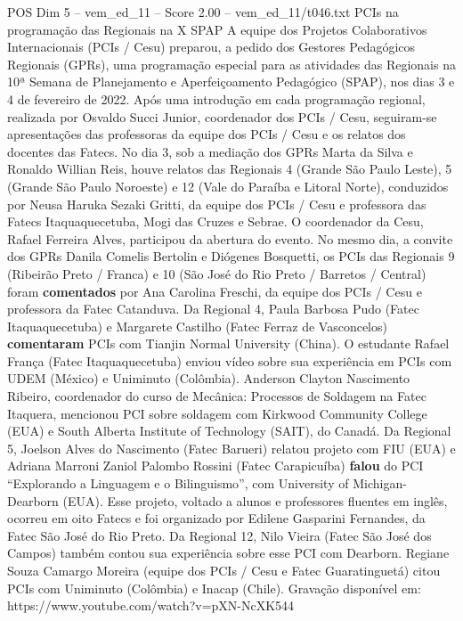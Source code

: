 \begin{textsample}{POS Dim 5 – vem\_ed\_11 – Score 2.00 – vem\_ed\_11/t046.txt}  \label{ex:f5_pos_115}
PCIs na programação das Regionais na X SPAP A equipe dos Projetos Colaborativos Internacionais (PCIs / Cesu) preparou, a pedido dos Gestores Pedagógicos Regionais (GPRs), uma programação especial para as atividades das Regionais na 10ª Semana de Planejamento e Aperfeiçoamento Pedagógico (SPAP), nos dias 3 e 4 de fevereiro de 2022.
Após uma introdução em cada programação regional, realizada por Osvaldo Succi Junior, coordenador dos PCIs / Cesu, seguiram-se apresentações das professoras da equipe dos PCIs / Cesu e os relatos dos docentes das Fatecs.
No dia 3, sob a mediação dos GPRs Marta da Silva e Ronaldo Willian Reis, houve relatos das Regionais 4 (Grande São Paulo Leste), 5 (Grande São Paulo Noroeste) e 12 (Vale do Paraíba e Litoral Norte), conduzidos por Neusa Haruka Sezaki Gritti, da equipe dos PCIs / Cesu e professora das Fatecs Itaquaquecetuba, Mogi das Cruzes e Sebrae.
O coordenador da Cesu, Rafael Ferreira Alves, participou da abertura do evento.
No mesmo dia, a convite dos GPRs Danila Comelis Bertolin e Diógenes Bosquetti, os PCIs das Regionais 9 (Ribeirão Preto / Franca) e 10 (São José do Rio Preto / Barretos / Central) foram \textbf{comentados} por Ana Carolina Freschi, da equipe dos PCIs / Cesu e professora da Fatec Catanduva.
Da Regional 4, Paula Barbosa Pudo (Fatec Itaquaquecetuba) e Margarete Castilho (Fatec Ferraz de Vasconcelos) \textbf{comentaram} PCIs com Tianjin Normal University (China).
O estudante Rafael França (Fatec Itaquaquecetuba) enviou vídeo sobre sua experiência em PCIs com UDEM (México) e Uniminuto (Colômbia).
Anderson Clayton Nascimento Ribeiro, coordenador do curso de Mecânica: Processos de Soldagem na Fatec Itaquera, mencionou PCI sobre soldagem com Kirkwood Community College (EUA) e South Alberta Institute of Technology (SAIT), do Canadá.
Da Regional 5, Joelson Alves do Nascimento (Fatec Barueri) relatou projeto com FIU (EUA) e Adriana Marroni Zaniol Palombo Rossini (Fatec Carapicuíba) \textbf{falou} do PCI “Explorando a Linguagem e o Bilinguismo”, com University of Michigan-Dearborn (EUA).
Esse projeto, voltado a alunos e professores fluentes em inglês, ocorreu em oito Fatecs e foi organizado por Edilene Gasparini Fernandes, da Fatec São José do Rio Preto.
Da Regional 12, Nilo Vieira (Fatec São José dos Campos) também contou sua experiência sobre esse PCI com Dearborn.
Regiane Souza Camargo Moreira (equipe dos PCIs / Cesu e Fatec Guaratinguetá) citou PCIs com Uniminuto (Colômbia) e Inacap (Chile).
Gravação disponível em: https://www.youtube.com/watch?v=pXN-NcXK544

\end{textsample}
